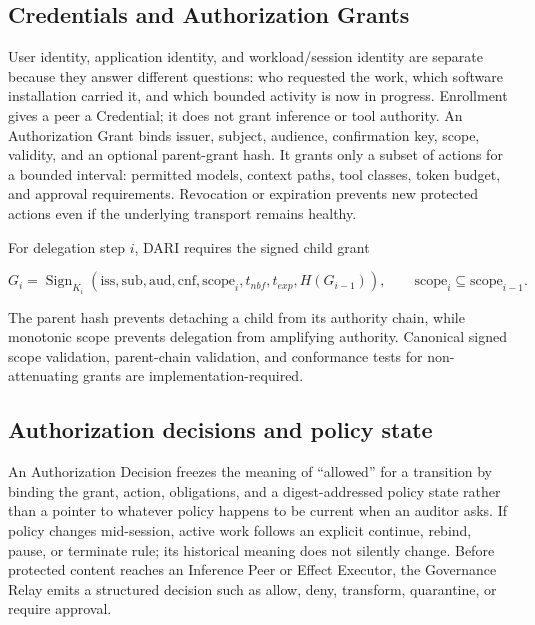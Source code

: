 \documentclass[10pt]{article}
\begin{document}
\subsection{Credentials and Authorization Grants}

User identity, application identity, and workload/session identity are separate because they answer different questions: who requested the work, which software installation carried it, and which bounded activity is now in progress. Enrollment gives a peer a Credential; it does not grant inference or tool authority. An Authorization Grant binds issuer, subject, audience, confirmation key, scope, validity, and an optional parent-grant hash. It grants only a subset of actions for a bounded interval: permitted models, context paths, tool classes, token budget, and approval requirements. Revocation or expiration prevents new protected actions even if the underlying transport remains healthy.

For delegation step $i$, DARI requires the signed child grant

\begin{equation}
G_i = \operatorname{Sign}_{K_i}(\mathrm{iss},\mathrm{sub},\mathrm{aud},\mathrm{cnf},\mathrm{scope}_i,t_{nbf},t_{exp},H(G_{i-1})),
\qquad \mathrm{scope}_i \subseteq \mathrm{scope}_{i-1}.
\label{eq:attenuation}
\end{equation}

The parent hash prevents detaching a child from its authority chain, while monotonic scope prevents delegation from amplifying authority. Canonical signed scope validation, parent-chain validation, and conformance tests for non-attenuating grants are implementation-required.

\subsection{Authorization decisions and policy state}

An Authorization Decision freezes the meaning of ``allowed'' for a transition by binding the grant, action, obligations, and a digest-addressed policy state rather than a pointer to whatever policy happens to be current when an auditor asks. If policy changes mid-session, active work follows an explicit continue, rebind, pause, or terminate rule; its historical meaning does not silently change. Before protected content reaches an Inference Peer or Effect Executor, the Governance Relay emits a structured decision such as allow, deny, transform, quarantine, or require approval.
\end{document}
